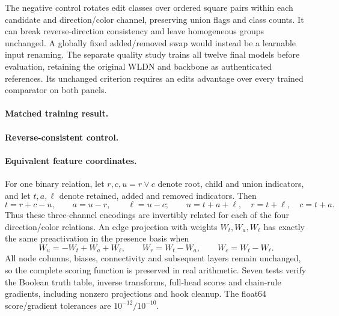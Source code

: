 The negative control rotates edit classes over ordered square pairs within
each candidate and direction/color channel, preserving union flags and class
counts. It can break reverse-direction consistency and leave homogeneous
groups unchanged. A globally fixed added/removed swap would instead be a
learnable input renaming. The separate quality study trains all twelve final
models before evaluation, retaining the original WLDN and backbone as
authenticated references. Its unchanged criterion requires an edits advantage
over every trained comparator on both panels.

\UnionEditControlInput{}

\paragraph{Matched training result.}
\UnionDifferenceQuality{}

\UnionDifferenceCost{}

\paragraph{Reverse-consistent control.}
\UnionConsistentEngineering{}

\paragraph{Equivalent feature coordinates.}
For one binary relation, let $r,c,u=r\lor c$ denote root, child and union
indicators, and let $t,a,\ell$ denote retained, added and removed indicators.
Then
\begin{equation}
 t=r+c-u,\qquad a=u-r,\qquad \ell=u-c;
 \qquad u=t+a+\ell,\quad r=t+\ell,\quad c=t+a.
\end{equation}
Thus these three-channel encodings are invertibly related for each of the four
direction/color relations. An edge projection with weights $W_t,W_a,W_\ell$
has exactly the same preactivation in the presence basis when
\begin{equation}
 W_u=-W_t+W_a+W_\ell,\qquad W_r=W_t-W_a,\qquad W_c=W_t-W_\ell.
\end{equation}
All node columns, biases, connectivity and subsequent layers remain unchanged,
so the complete scoring function is preserved in real arithmetic. Seven tests
verify the Boolean truth table, inverse transforms, full-head scores and
chain-rule gradients, including nonzero projections and hook cleanup.
The float64 score/gradient tolerances are $10^{-12}/10^{-10}$.

